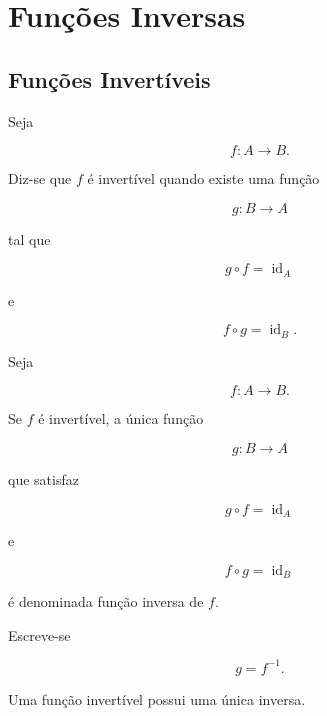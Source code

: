 \documentclass[../../main]{subfiles}
\begin{document}
\section{Funções Inversas}
\label{sec:matematica:funcoes:funcoes-inversas}

\subsection{Funções Invertíveis}

\begin{defn}
	\label{def:matematica:funcoes:funcoes-inversas:invertivel}

	Seja

	\[
		f:A\to B.
	\]

	Diz-se que \(f\) é invertível quando existe uma função

	\[
		g:B\to A
	\]

	tal que

	\[
		g\circ f
		=
		\operatorname{id}_A
	\]

	e

	\[
		f\circ g
		=
		\operatorname{id}_B.
	\]

\end{defn}

\begin{defn}
	\label{def:matematica:funcoes:funcoes-inversas:funcao-inversa}

	Seja

	\[
		f:A\to B.
	\]

	Se \(f\) é invertível, a única função

	\[
		g:B\to A
	\]

	que satisfaz

	\[
		g\circ f
		=
		\operatorname{id}_A
	\]

	e

	\[
		f\circ g
		=
		\operatorname{id}_B
	\]

	é denominada função inversa de \(f\).

	Escreve-se

	\[
		g=f^{-1}.
	\]

\end{defn}

\begin{prop}
	\label{prop:matematica:funcoes:funcoes-inversas:unicidade}

	Uma função invertível possui uma única inversa.

\end{prop}
\end{document}
